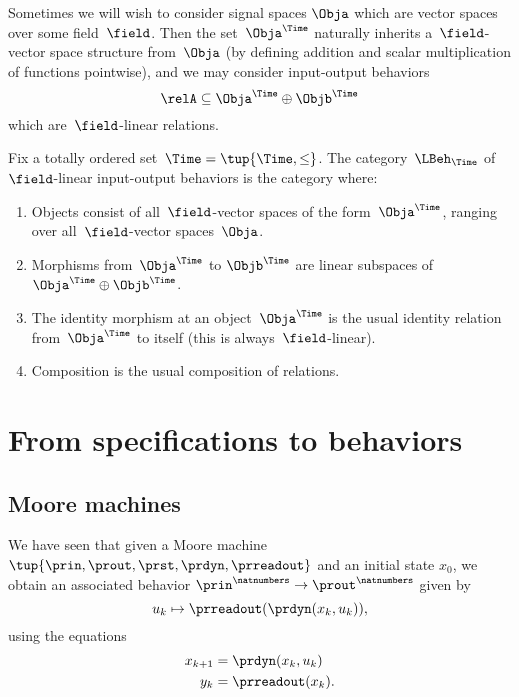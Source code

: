 {    Sometimes we will wish to consider signal spaces $\Obja$ which are vector spaces over some field~$\field$.
    Then the set~$\Obja^\Time$ naturally inherits a~$\field$-vector space structure from~$\Obja$ (by defining addition and scalar multiplication of functions pointwise), and we may consider input-output behaviors
    \begin{equation*}
        \relA \subseteq \Obja^\Time \oplus \Objb^\Time
    \end{equation*}
    which are~$\field$-linear relations.

    \begin{definition}
        Fix a totally ordered set~$\Time = \tup{\Time, \leq}$.
        The category~$\LBeh_\Time$ of~$\field$-linear input-output behaviors is the category where:
        \begin{enumerate}
            \item Objects consist of all~$\field$-vector spaces of the form~$\Obja^\Time$, ranging over all~$\field$-vector spaces~$\Obja$.
            \item Morphisms from~$\Obja^\Time$ to $\Objb^\Time$ are linear subspaces of~$\Obja^\Time \oplus \Objb^\Time$.
            \item The identity morphism at an object~$\Obja^\Time$ is the usual identity relation from~$\Obja^\Time$ to itself (this is always~$\field$-linear).
            \item Composition is the usual composition of relations.
        \end{enumerate}
    \end{definition}

    \section{From specifications to behaviors}


    \subsection{Moore machines}

    We have seen that given a Moore machine $\tup{\prin, \prout, \prst, \prdyn, \prreadout}$ and an initial state $x_0$, we obtain an associated behavior $\prin^\natnumbers \to  \prout^\natnumbers$ given by
    \begin{equation}
        u_k \mapsto \prreadout(\prdyn(x_k, u_k)),
    \end{equation}
    using the equations
    \begin{align}
        x_{k+1} & = \prdyn(x_k, u_k) \\
        y_{k}   & = \prreadout(x_{k}).
    \end{align}

}
